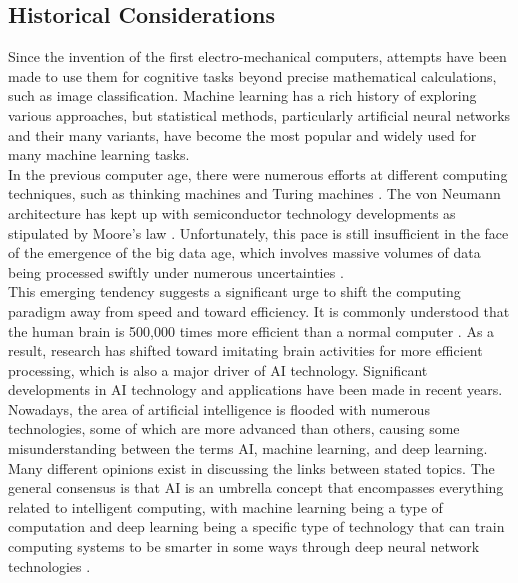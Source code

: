 \subsection[Historical Considerations]{Historical Considerations}

Since the invention of the first electro-mechanical computers, attempts have been made to use them for cognitive tasks beyond precise mathematical calculations, such as image classification. Machine learning has a rich history of exploring various approaches, but statistical methods, particularly artificial neural networks and their many variants, have become the most popular and widely used for many machine learning tasks. \\

\noindent In the previous computer age, there were numerous efforts at different computing techniques, such as thinking machines and Turing machines \cite{fischetti2011computers}. The von Neumann \cite{schmidhuber2015deep} architecture has kept up with semiconductor technology developments as stipulated by Moore's law \cite{turing2004computable}. Unfortunately, this pace is still insufficient in the face of the emergence of the big data age, which involves massive volumes of data being processed swiftly under numerous uncertainties \cite{mccarthy2006proposal}. \\

\noindent This emerging tendency suggests a significant urge to shift the computing paradigm away from speed and toward efficiency. It is commonly understood that the human brain is 500,000 times more efficient than a normal computer \cite{silver2017mastering}. As a result, research has shifted toward imitating brain activities for more efficient processing, which is also a major driver of AI technology. Significant developments in AI technology and applications have been made in recent years. \\


\noindent Nowadays, the area of artificial intelligence is flooded with numerous technologies, some of which are more advanced than others, causing some misunderstanding between the terms AI, machine learning, and deep learning. Many different opinions exist in discussing the links between stated topics. The general consensus is that AI is an umbrella concept that encompasses everything related to intelligent computing, with machine learning being a type of computation and deep learning being a specific type of technology that can train computing systems to be smarter in some ways through deep neural network technologies \cite{bajo2018neural}. \\ 

